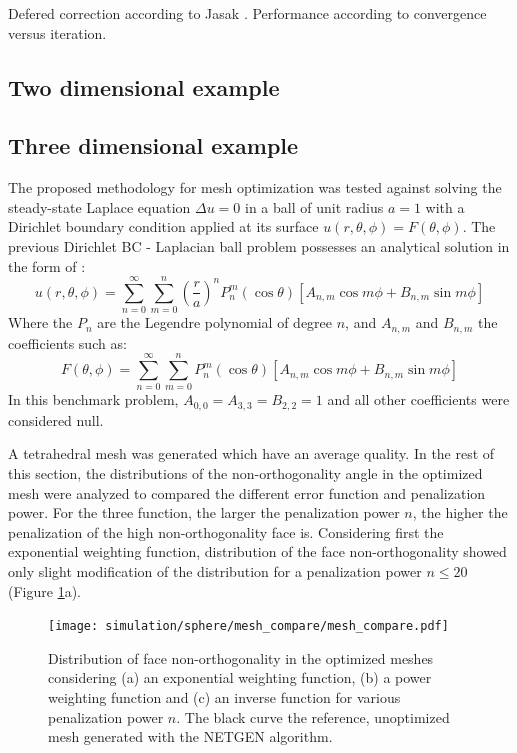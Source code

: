 \documentclass[11pt]{article}
\begin{document}
Defered correction according to Jasak \cite{}. Performance according to convergence versus iteration.



\subsection{Two dimensional example}

\subsection{Three dimensional example}

The proposed methodology for mesh optimization was tested against solving the steady-state Laplace equation $\Delta u = 0$ in a ball of unit radius $a=1$ with a Dirichlet boundary condition applied at its surface $u(r,\theta,\phi) = F(\theta,\phi)$. %
The previous Dirichlet BC - Laplacian ball problem possesses an analytical solution in the form of \cite{carslaw_jeager_1957}:
%
\begin{equation}
u(r, \theta, \phi) = \sum_{n=0}^\infty \sum_{m=0}^n \left(\frac{r}{a}\right)^n P_n^m(\cos \theta) \left[ A_{n,m} \cos m\phi + B_{n,m} \sin m\phi \right]
\end{equation} 
%
Where the $P_n$ are the Legendre polynomial of degree $n$, and $A_{n,m}$ and $B_{n,m}$ the coefficients such as:
%
\begin{equation}
F(\theta, \phi) = \sum_{n=0}^\infty \sum_{m=0}^n P_n^m(\cos \theta) \left[ A_{n,m} \cos m\phi + B_{n,m} \sin m\phi \right]
\end{equation}
%
In this benchmark problem, $A_{0,0} = A_{3,3} = B_{2,2} =1$ and all other coefficients were considered null.

A tetrahedral mesh was generated which have an average quality.
In the rest of this section, the distributions of the non-orthogonality angle in the optimized mesh were analyzed to compared the different error function and penalization power.
For the three function, the larger the penalization power $n$, the higher the penalization of the high non-orthogonality face is.
Considering first the exponential weighting function, distribution of the face non-orthogonality showed only slight modification of the distribution for a penalization power $n \leq 20$ (Figure \ref{orthogonality_distribution}a).

\begin{figure}[h!]
  \centering
  \texttt{[image: simulation/sphere/mesh\_compare/mesh\_compare.pdf]}
  \label{orthogonality_distribution}
  \caption{Distribution of face non-orthogonality in the optimized meshes considering (a) an exponential weighting function, (b) a power weighting function and (c) an inverse function for various penalization power $n$. The black curve the reference, unoptimized mesh generated with the NETGEN algorithm.}
\end{figure}
\end{document}
